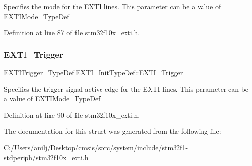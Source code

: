 Specifies the mode for the E\+X\+TI lines. This parameter can be a value of \hyperlink{group___e_x_t_i___exported___types_gad5e69af98dc0dfdf64417adc1cf57929}{E\+X\+T\+I\+Mode\+\_\+\+Type\+Def} 

Definition at line 87 of file stm32f10x\+\_\+exti.\+h.

\mbox{\label{struct_e_x_t_i___init_type_def_ab0bd8417e78fe2b43eed79e44064510c}} 
\subsubsection{\texorpdfstring{E\+X\+T\+I\+\_\+\+Trigger}{EXTI\_Trigger}}
{\footnotesize\ttfamily \hyperlink{group___e_x_t_i___exported___types_ga9da190f5425d1b421a06bced8cc48e9b}{E\+X\+T\+I\+Trigger\+\_\+\+Type\+Def} E\+X\+T\+I\+\_\+\+Init\+Type\+Def\+::\+E\+X\+T\+I\+\_\+\+Trigger}

Specifies the trigger signal active edge for the E\+X\+TI lines. This parameter can be a value of \hyperlink{group___e_x_t_i___exported___types_gad5e69af98dc0dfdf64417adc1cf57929}{E\+X\+T\+I\+Mode\+\_\+\+Type\+Def} 

Definition at line 90 of file stm32f10x\+\_\+exti.\+h.



The documentation for this struct was generated from the following file\+:\begin{DoxyCompactItemize}
\item 
C\+:/\+Users/anilj/\+Desktop/cmsis/sorc/system/include/stm32f1-\/stdperiph/\hyperlink{stm32f10x__exti_8h}{stm32f10x\+\_\+exti.\+h}\end{DoxyCompactItemize}
